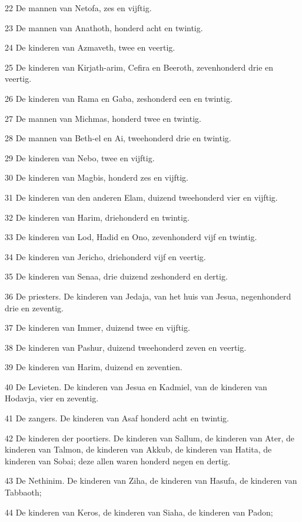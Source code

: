 \par 22 De mannen van Netofa, zes en vijftig.
\par 23 De mannen van Anathoth, honderd acht en twintig.
\par 24 De kinderen van Azmaveth, twee en veertig.
\par 25 De kinderen van Kirjath-arim, Cefira en Beeroth, zevenhonderd drie en veertig.
\par 26 De kinderen van Rama en Gaba, zeshonderd een en twintig.
\par 27 De mannen van Michmas, honderd twee en twintig.
\par 28 De mannen van Beth-el en Ai, tweehonderd drie en twintig.
\par 29 De kinderen van Nebo, twee en vijftig.
\par 30 De kinderen van Magbis, honderd zes en vijftig.
\par 31 De kinderen van den anderen Elam, duizend tweehonderd vier en vijftig.
\par 32 De kinderen van Harim, driehonderd en twintig.
\par 33 De kinderen van Lod, Hadid en Ono, zevenhonderd vijf en twintig.
\par 34 De kinderen van Jericho, driehonderd vijf en veertig.
\par 35 De kinderen van Senaa, drie duizend zeshonderd en dertig.
\par 36 De priesters. De kinderen van Jedaja, van het huis van Jesua, negenhonderd drie en zeventig.
\par 37 De kinderen van Immer, duizend twee en vijftig.
\par 38 De kinderen van Pashur, duizend tweehonderd zeven en veertig.
\par 39 De kinderen van Harim, duizend en zeventien.
\par 40 De Levieten. De kinderen van Jesua en Kadmiel, van de kinderen van Hodavja, vier en zeventig.
\par 41 De zangers. De kinderen van Asaf honderd acht en twintig.
\par 42 De kinderen der poortiers. De kinderen van Sallum, de kinderen van Ater, de kinderen van Talmon, de kinderen van Akkub, de kinderen van Hatita, de kinderen van Sobai; deze allen waren honderd negen en dertig.
\par 43 De Nethinim. De kinderen van Ziha, de kinderen van Hasufa, de kinderen van Tabbaoth;
\par 44 De kinderen van Keros, de kinderen van Siaha, de kinderen van Padon;
